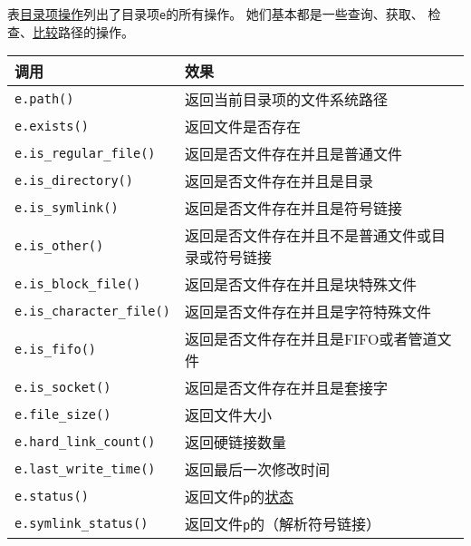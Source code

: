表\hyperref[t20.22]{目录项操作}列出了目录项\texttt{e}的所有操作。
她们基本都是一些查询、获取、
检查、\hyperref[ch20.3.6]{比较}路径的操作。
\begin{table}[htb]
    \centering
    \begin{tabular}{l|l}
        \hline
        \textbf{调用}                      & \textbf{效果}                                \\
        \hline
        \texttt{e.path()}                & 返回当前目录项的文件系统路径                             \\
        \texttt{e.exists()}              & 返回文件是否存在                                   \\
        \texttt{e.is\_regular\_file()}   & 返回是否文件存在并且是普通文件                            \\
        \texttt{e.is\_directory()}       & 返回是否文件存在并且是目录                              \\
        \texttt{e.is\_symlink()}         & 返回是否文件存在并且是符号链接                            \\
        \texttt{e.is\_other()}           & 返回是否文件存在并且不是普通文件或目录或符号链接                   \\
        \texttt{e.is\_block\_file()}     & 返回是否文件存在并且是块特殊文件                           \\
        \texttt{e.is\_character\_file()} & 返回是否文件存在并且是字符特殊文件                          \\
        \texttt{e.is\_fifo()}            & 返回是否文件存在并且是FIFO或者管道文件                      \\
        \texttt{e.is\_socket()}          & 返回是否文件存在并且是套接字                             \\
        \texttt{e.file\_size()}          & 返回文件大小                                     \\
        \texttt{e.hard\_link\_count()}   & 返回硬链接数量                                    \\
        \texttt{e.last\_write\_time()}   & 返回最后一次修改时间                                 \\
        \texttt{e.status()}              & 返回文件\texttt{p}的\hyperref[ch20.4.2]{状态}     \\
        \texttt{e.symlink\_status()}     & 返回文件\texttt{p}的\nameref{ch20.4.2}（解析符号链接）  \\

\end{tabular}
\end{table}

